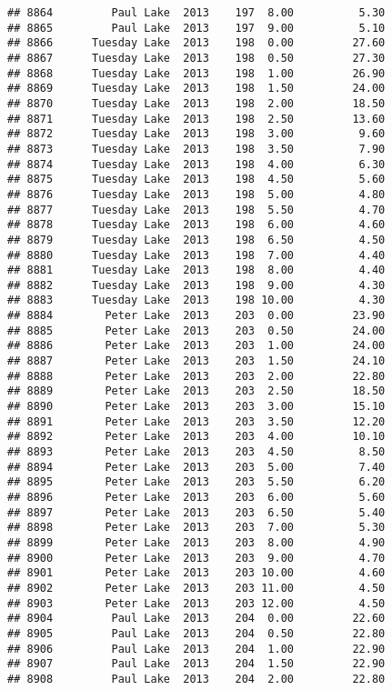 \documentclass[
]{article}
\begin{document}
\begin{verbatim}
## 8864         Paul Lake  2013    197  8.00          5.30
## 8865         Paul Lake  2013    197  9.00          5.10
## 8866      Tuesday Lake  2013    198  0.00         27.60
## 8867      Tuesday Lake  2013    198  0.50         27.30
## 8868      Tuesday Lake  2013    198  1.00         26.90
## 8869      Tuesday Lake  2013    198  1.50         24.00
## 8870      Tuesday Lake  2013    198  2.00         18.50
## 8871      Tuesday Lake  2013    198  2.50         13.60
## 8872      Tuesday Lake  2013    198  3.00          9.60
## 8873      Tuesday Lake  2013    198  3.50          7.90
## 8874      Tuesday Lake  2013    198  4.00          6.30
## 8875      Tuesday Lake  2013    198  4.50          5.60
## 8876      Tuesday Lake  2013    198  5.00          4.80
## 8877      Tuesday Lake  2013    198  5.50          4.70
## 8878      Tuesday Lake  2013    198  6.00          4.60
## 8879      Tuesday Lake  2013    198  6.50          4.50
## 8880      Tuesday Lake  2013    198  7.00          4.40
## 8881      Tuesday Lake  2013    198  8.00          4.40
## 8882      Tuesday Lake  2013    198  9.00          4.30
## 8883      Tuesday Lake  2013    198 10.00          4.30
## 8884        Peter Lake  2013    203  0.00         23.90
## 8885        Peter Lake  2013    203  0.50         24.00
## 8886        Peter Lake  2013    203  1.00         24.00
## 8887        Peter Lake  2013    203  1.50         24.10
## 8888        Peter Lake  2013    203  2.00         22.80
## 8889        Peter Lake  2013    203  2.50         18.50
## 8890        Peter Lake  2013    203  3.00         15.10
## 8891        Peter Lake  2013    203  3.50         12.20
## 8892        Peter Lake  2013    203  4.00         10.10
## 8893        Peter Lake  2013    203  4.50          8.50
## 8894        Peter Lake  2013    203  5.00          7.40
## 8895        Peter Lake  2013    203  5.50          6.20
## 8896        Peter Lake  2013    203  6.00          5.60
## 8897        Peter Lake  2013    203  6.50          5.40
## 8898        Peter Lake  2013    203  7.00          5.30
## 8899        Peter Lake  2013    203  8.00          4.90
## 8900        Peter Lake  2013    203  9.00          4.70
## 8901        Peter Lake  2013    203 10.00          4.60
## 8902        Peter Lake  2013    203 11.00          4.50
## 8903        Peter Lake  2013    203 12.00          4.50
## 8904         Paul Lake  2013    204  0.00         22.60
## 8905         Paul Lake  2013    204  0.50         22.80
## 8906         Paul Lake  2013    204  1.00         22.90
## 8907         Paul Lake  2013    204  1.50         22.90
## 8908         Paul Lake  2013    204  2.00         22.80

\end{verbatim}
\end{document}
